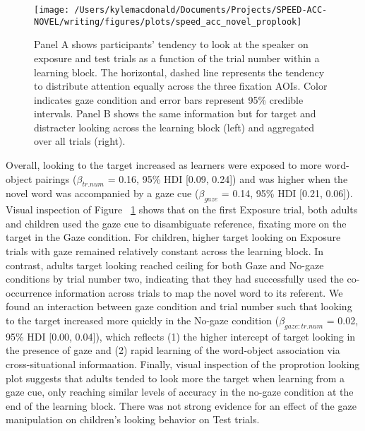 \documentclass[man,floatsintext]{apa6}
\begin{document}
\begin{figure}[!t]

{\centering \texttt{[image: /Users/kylemacdonald/Documents/Projects/SPEED-ACC-NOVEL/writing/figures/plots/speed\_acc\_novel\_proplook]} 

}

\caption{Panel A shows participants’ tendency to look at the speaker on exposure and test trials as a function of the trial number within a learning block. The horizontal, dashed line represents the tendency to distribute attention equally across the three fixation AOIs. Color indicates gaze condition and error bars represent 95\% credible intervals. Panel B shows the same information but for target and distracter looking across the learning block (left) and aggregated over all trials (right).}\label{fig:san-prop-looking-plot}
\end{figure}

Overall, looking to the target increased as learners were exposed to
more word-object pairings (\(\beta_{tr.num}\) = 0.16, 95\% HDI {[}0.09,
0.24{]}) and was higher when the novel word was accompanied by a gaze
cue (\(\beta_{gaze}\) = 0.14, 95\% HDI {[}0.21, 0.06{]}). Visual
inspection of Figure ~\ref{fig:san-prop-looking-plot} shows that on the
first Exposure trial, both adults and children used the gaze cue to
disambiguate reference, fixating more on the target in the Gaze
condition. For children, higher target looking on Exposure trials with
gaze remained relatively constant across the learning block. In
contrast, adults target looking reached ceiling for both Gaze and
No-gaze conditions by trial number two, indicating that they had
successfully used the co-occurrence information across trials to map the
novel word to its referent. We found an interaction between gaze
condition and trial number such that looking to the target increased
more quickly in the No-gaze condition (\(\beta_{gaze:tr.num}\) = 0.02,
95\% HDI {[}0.00, 0.04{]}), which reflects (1) the higher intercept of
target looking in the presence of gaze and (2) rapid learning of the
word-object association via cross-situational informaation. Finally,
visual inspection of the proprotion looking plot suggests that adults
tended to look more the target when learning from a gaze cue, only
reaching similar levels of accuracy in the no-gaze condition at the end
of the learning block. There was not strong evidence for an effect of
the gaze manipulation on children's looking behavior on Test trials.
\end{document}
